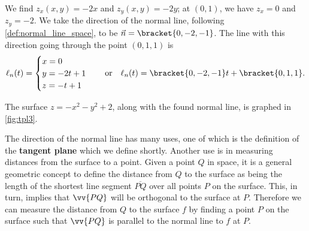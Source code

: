 {We find $z_x(x,y) = -2x$ and $z_y(x,y) = -2y$; at $(0,1)$, we have $z_x = 0$ and $z_y = -2$. We take the direction of the normal line, following \autoref{def:normal_line_space}, to be $\vec n=\bracket{0,-2,-1}$. The line with this direction going through the point $(0,1,1)$ is 
%
%
$$\ell_n(t) = \begin{cases}x=0\\y=-2t+1\\z=-t+1\end{cases}\quad \text{or}\quad \ell_n(t)=\bracket{0,-2,-1}t+\bracket{0,1,1}.$$

The surface $z=-x^2-y^2+2$, along with the found normal line, is graphed in \autoref{fig:tpl3}.}

The direction of the normal line has many uses, one of which is the definition of the \textbf{tangent plane} which we define shortly. Another use is in measuring distances from the surface to a point. Given a point $Q$ in space, it is a general geometric concept to define the distance from $Q$ to the surface as being the length of the shortest line segment $\overline{PQ}$ over all points $P$ on the surface. This, in turn, implies that $\vv{PQ}$ will be orthogonal to the surface at $P$. Therefore we can measure the distance from $Q$ to the surface $f$ by finding a point $P$ on the surface such that $\vv{PQ}$ is parallel to the normal line to $f$ at $P$.

